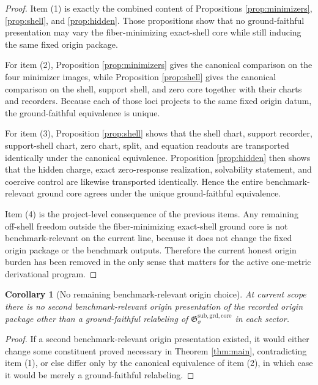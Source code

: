 \documentclass[11pt]{article}
\newcommand{\GroundCore}{\mathfrak G^{\mathrm{sub,grd,core}}}
\newtheorem{corollary}{Corollary}
\begin{document}
\begin{proof}
Item (1) is exactly the combined content of Propositions \ref{prop:minimizers}, \ref{prop:shell}, and \ref{prop:hidden}. Those propositions show that no ground-faithful presentation may vary the fiber-minimizing exact-shell core while still inducing the same fixed origin package.

For item (2), Proposition \ref{prop:minimizers} gives the canonical comparison on the four minimizer images, while Proposition \ref{prop:shell} gives the canonical comparison on the shell, support shell, and zero core together with their charts and recorders. Because each of those loci projects to the same fixed origin datum, the ground-faithful equivalence is unique.

For item (3), Proposition \ref{prop:shell} shows that the shell chart, support recorder, support-shell chart, zero chart, split, and equation readouts are transported identically under the canonical equivalence. Proposition \ref{prop:hidden} then shows that the hidden charge, exact zero-response realization, solvability statement, and coercive control are likewise transported identically. Hence the entire benchmark-relevant ground core agrees under the unique ground-faithful equivalence.

Item (4) is the project-level consequence of the previous items. Any remaining off-shell freedom outside the fiber-minimizing exact-shell ground core is not benchmark-relevant on the current line, because it does not change the fixed origin package or the benchmark outputs. Therefore the current honest origin burden has been removed in the only sense that matters for the active one-metric derivational program.
\end{proof}

\begin{corollary}[No remaining benchmark-relevant origin choice]
\label{cor:nofreedom}
At current scope there is no second benchmark-relevant origin presentation of the recorded origin package other than a ground-faithful relabeling of \(\GroundCore_{\sigma}\) in each sector.
\end{corollary}

\begin{proof}
If a second benchmark-relevant origin presentation existed, it would either change some constituent proved necessary in Theorem \ref{thm:main}, contradicting item (1), or else differ only by the canonical equivalence of item (2), in which case it would be merely a ground-faithful relabeling.
\end{proof}
\end{document}
